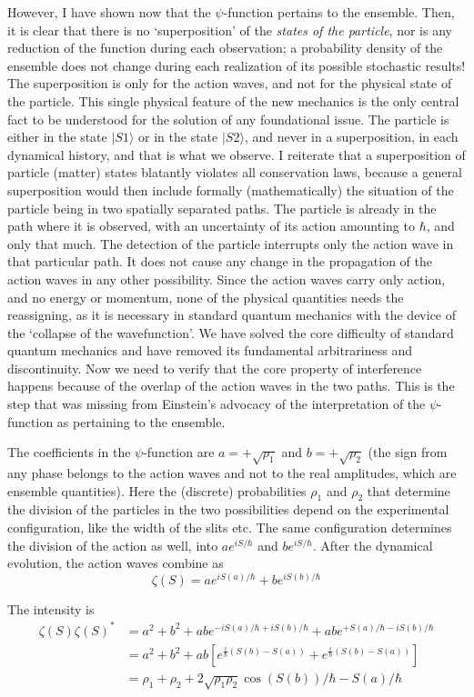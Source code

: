 However, I have shown now that the $\psi$-function pertains to the ensemble. Then, it is
clear that there is no `superposition' of the \textit{states of the particle}, nor is any reduction of
the function during each observation; a probability density of the ensemble does not change
during each realization of its possible stochastic results! The superposition is only for the
action waves, and not for the physical state of the particle. This single physical feature
of the new mechanics is the only central fact to be understood for the solution of any
foundational issue. The particle is either in the state $|S1 \rangle$ or in the state $|S2\rangle$, and never
in a superposition, in each dynamical history, and that is what we observe. I reiterate that
a superposition of particle (matter) states blatantly violates all conservation laws, because
a general superposition would then include formally (mathematically) the situation of the
particle being in two spatially separated paths. The particle is already in the path where
it is observed, with an uncertainty of its action amounting to $\hbar$, and only that much. The
detection of the particle interrupts only the action wave in that particular path. It does not
cause any change in the propagation of the action waves in any other possibility. Since the
action waves carry only action, and no energy or momentum, none of the physical quantities
needs the reassigning, as it is necessary in standard quantum mechanics with the device of
the `collapse of the wavefunction'. We have solved the core difficulty of standard quantum
mechanics and have removed its fundamental arbitrariness and discontinuity. Now we need
to verify that the core property of interference happens because of the overlap of the action
waves in the two paths. This is the step that was missing from Einstein’s advocacy of the
interpretation of the $\psi$-function as pertaining to the ensemble.

The coefficients in the $\psi$-function are $a = + \sqrt{\rho_1}$ and $b = + \sqrt{\rho_2}$ (the sign from any phase
belongs to the action waves and not to the real amplitudes, which are ensemble quantities).
Here the (discrete) probabilities $\rho_1$ and $\rho_2$ that determine the division of the particles in the
two possibilities depend on the experimental configuration, like the width of the slits etc.
The same configuration determines the division of the action as well, into $ae^{iS/\hbar}$ and $be^{iS/\hbar}$.
After the dynamical evolution, the action waves combine as
\begin{equation*}
\zeta(S) = ae^{iS(a)/\hbar} + be^{iS (b)/\hbar} \tag{29}
\end{equation*}

The intensity is
\begin{align*}
\zeta (S) \zeta (S)^{\ast} & = a^2 + b^2 + abe^{-iS (a) /\hbar + iS (b)/\hbar} + abe^{+ S (a)/\hbar - iS (b)/\hbar}  \\
& = a^2 + b^2 + ab \left[e^{\frac{i}{\hbar} (S(b) - S(a))} + e^{\frac{i}{\hbar}(S(b) - S (a))} \right] \tag{30}\\
& = \rho_1 + \rho_2 + 2 \sqrt{\rho_1 \rho_2} \cos  (S (b)) / \hbar - S (a) / \hbar
\end{align*}

